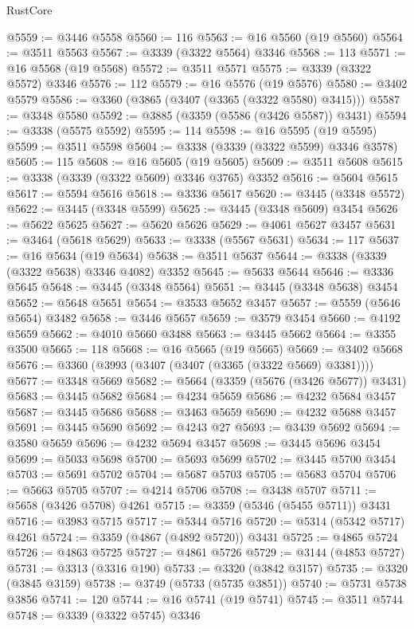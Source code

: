 \begin{lexlean}{RustCore}
\begin{coremodule}
@5559 := @3446 @5558
@5560 := 116
@5563 := @16 @5560 (@19 @5560)
@5564 := @3511 @5563
@5567 := @3339 (@3322 @5564) @3346
@5568 := 113
@5571 := @16 @5568 (@19 @5568)
@5572 := @3511 @5571
@5575 := @3339 (@3322 @5572) @3346
@5576 := 112
@5579 := @16 @5576 (@19 @5576)
@5580 := @3402 @5579
@5586 := @3360 (@3865 (@3407 (@3365 (@3322 @5580) @3415)))
@5587 := @3348 @5580
@5592 := @3885 (@3359 (@5586 (@3426 @5587)) @3431)
@5594 := @3338 (@5575 @5592)
@5595 := 114
@5598 := @16 @5595 (@19 @5595)
@5599 := @3511 @5598
@5604 := @3338 (@3339 (@3322 @5599) @3346 @3578)
@5605 := 115
@5608 := @16 @5605 (@19 @5605)
@5609 := @3511 @5608
@5615 := @3338 (@3339 (@3322 @5609) @3346 @3765) @3352
@5616 := @5604 @5615
@5617 := @5594 @5616
@5618 := @3336 @5617
@5620 := @3445 (@3348 @5572)
@5622 := @3445 (@3348 @5599)
@5625 := @3445 (@3348 @5609) @3454
@5626 := @5622 @5625
@5627 := @5620 @5626
@5629 := @4061 @5627 @3457
@5631 := @3464 (@5618 @5629)
@5633 := @3338 (@5567 @5631)
@5634 := 117
@5637 := @16 @5634 (@19 @5634)
@5638 := @3511 @5637
@5644 := @3338 (@3339 (@3322 @5638) @3346 @4082) @3352
@5645 := @5633 @5644
@5646 := @3336 @5645
@5648 := @3445 (@3348 @5564)
@5651 := @3445 (@3348 @5638) @3454
@5652 := @5648 @5651
@5654 := @3533 @5652 @3457
@5657 := @5559 (@5646 @5654) @3482
@5658 := @3446 @5657
@5659 := @3579 @3454
@5660 := @4192 @5659
@5662 := @4010 @5660 @3488
@5663 := @3445 @5662
@5664 := @3355 @3500
@5665 := 118
@5668 := @16 @5665 (@19 @5665)
@5669 := @3402 @5668
@5676 := @3360 (@3993 (@3407 (@3407 (@3365 (@3322 @5669) @3381))))
@5677 := @3348 @5669
@5682 := @5664 (@3359 (@5676 (@3426 @5677)) @3431)
@5683 := @3445 @5682
@5684 := @4234 @5659
@5686 := @4232 @5684 @3457
@5687 := @3445 @5686
@5688 := @3463 @5659
@5690 := @4232 @5688 @3457
@5691 := @3445 @5690
@5692 := @4243 @27
@5693 := @3439 @5692
@5694 := @3580 @5659
@5696 := @4232 @5694 @3457
@5698 := @3445 @5696 @3454
@5699 := @5033 @5698
@5700 := @5693 @5699
@5702 := @3445 @5700 @3454
@5703 := @5691 @5702
@5704 := @5687 @5703
@5705 := @5683 @5704
@5706 := @5663 @5705
@5707 := @4214 @5706
@5708 := @3438 @5707
@5711 := @5658 (@3426 @5708) @4261
@5715 := @3359 (@5346 (@5455 @5711)) @3431
@5716 := @3983 @5715
@5717 := @5344 @5716
@5720 := @5314 (@5342 @5717) @4261
@5724 := @3359 (@4867 (@4892 @5720)) @3431
@5725 := @4865 @5724
@5726 := @4863 @5725
@5727 := @4861 @5726
@5729 := @3144 (@4853 @5727)
@5731 := @3313 (@3316 @190)
@5733 := @3320 (@3842 @3157)
@5735 := @3320 (@3845 @3159)
@5738 := @3749 (@5733 (@5735 @3851))
@5740 := @5731 @5738 @3856
@5741 := 120
@5744 := @16 @5741 (@19 @5741)
@5745 := @3511 @5744
@5748 := @3339 (@3322 @5745) @3346

\end{coremodule}
\end{lexlean}
